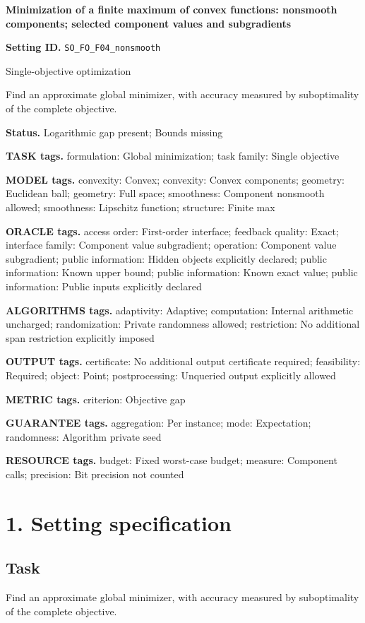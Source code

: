 \documentclass[10pt,a4paper]{article}
\begin{document}
\raggedright

{\LARGE\bfseries\sffamily\color{AtlasNavy} Minimization of a finite maximum of convex functions: nonsmooth components; selected component values and subgradients\par}\vspace{5pt}
\textbf{Setting ID.} \texttt{SO\_\allowbreak{}FO\_\allowbreak{}F04\_\allowbreak{}nonsmooth}

Single-objective optimization

Find an approximate global minimizer, with accuracy measured by suboptimality of the complete objective.

\textbf{Status.} Logarithmic gap present; Bounds missing

\textbf{TASK tags.} formulation: Global minimization; task family: Single objective

\textbf{MODEL tags.} convexity: Convex; convexity: Convex components; geometry: Euclidean ball; geometry: Full space; smoothness: Component nonsmooth allowed; smoothness: Lipschitz function; structure: Finite max

\textbf{ORACLE tags.} access order: First-order interface; feedback quality: Exact; interface family: Component value subgradient; operation: Component value subgradient; public information: Hidden objects explicitly declared; public information: Known upper bound; public information: Known exact value; public information: Public inputs explicitly declared

\textbf{ALGORITHMS tags.} adaptivity: Adaptive; computation: Internal arithmetic uncharged; randomization: Private randomness allowed; restriction: No additional span restriction explicitly imposed

\textbf{OUTPUT tags.} certificate: No additional output certificate required; feasibility: Required; object: Point; postprocessing: Unqueried output explicitly allowed

\textbf{METRIC tags.} criterion: Objective gap

\textbf{GUARANTEE tags.} aggregation: Per instance; mode: Expectation; randomness: Algorithm private seed

\textbf{RESOURCE tags.} budget: Fixed worst-case budget; measure: Component calls; precision: Bit precision not counted

\section{1. Setting specification}
\subsection{Task}
Find an approximate global minimizer, with accuracy measured by suboptimality of the complete objective.
\end{document}

